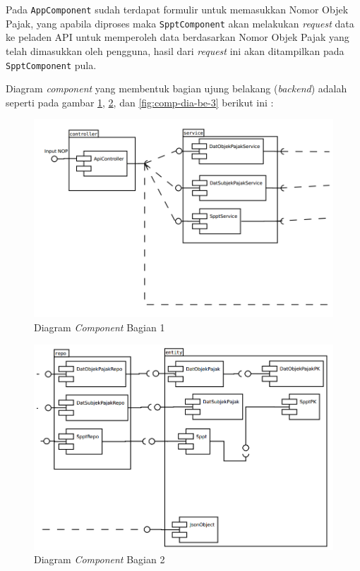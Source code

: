 Pada \texttt{AppComponent} sudah terdapat formulir untuk memasukkan Nomor Objek Pajak, yang apabila diproses maka \texttt{SpptComponent} akan melakukan \textit{request} data ke peladen API untuk memperoleh data berdasarkan Nomor Objek Pajak yang telah dimasukkan oleh pengguna, hasil dari \textit{request} ini akan ditampilkan pada \texttt{SpptComponent} pula.

Diagram \textit{component} yang membentuk bagian ujung belakang (\textit{backend}) adalah seperti pada gambar \ref{fig:comp-dia-be-1}, \ref{fig:comp-dia-be-2}, dan \ref{fig:comp-dia-be-3} berikut ini :

\begin{figure}[H]
	\centering
	\includegraphics[width=1\textwidth]{./resources/uml/comp-dia-backend-1}
	\caption{Diagram \textit{Component} Bagian 1}
	\label{fig:comp-dia-be-1}
\end{figure}

\begin{figure}[H]
	\centering
	\includegraphics[width=1\textwidth]{./resources/uml/comp-dia-backend-2}
	\caption{Diagram \textit{Component} Bagian 2}
	\label{fig:comp-dia-be-2}
\end{figure}

